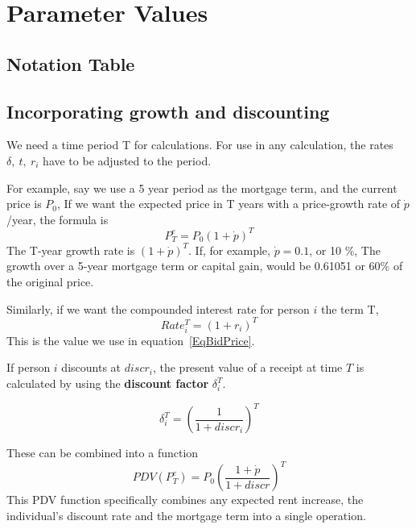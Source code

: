 \chapter[Parameters]{Parameter Values}
\label{AppendixA}
  
    
    
    
 

\section{Notation Table}


\section{Incorporating growth and discounting}
We need a time period T for calculations. For use in any calculation, the rates $\delta,\ t,\ r_i$ have to be adjusted to the period.

For example, say we use  a 5 year period as the mortgage term, and the current price is $P_0$, If we want the expected price in  T years   with a price-growth rate of $\dot p$ /year, the formula is 
\[P^e_T=P_0(1+\dot p)^T\]
The T-year growth rate is $(1+\dot p)^T$. If, for example, $\dot p= 0.1$, or 10 \%, The growth  over a 5-year mortgage term or capital gain, would be 0.61051 or 60\% of the original price.

Similarly, if we want the compounded interest rate for person $i$ the term T,
\[Rate_i^T=(1+r_i)^T\]
This is the value we use in equation~\ref{EqBidPrice}.


If person $i$  discounts at $discr_i$, the present value of  a receipt at time $T$ is calculated by using the \textbf{discount factor} $\delta_i^T$.

\[\delta_i^T= \left( \frac{1}{1+discr_i} \right)^T \]
 
These can be combined into a function %
\[ PDV(P^e_T)=P_0\left( \frac{1+\dot p}{1+discr} \right)^T \]
This PDV function specifically combines any expected rent increase, the individual's discount rate and the mortgage term into a single operation. 




